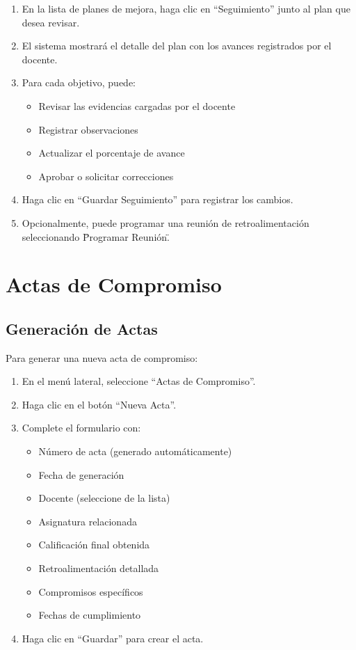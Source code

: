 \documentclass[12pt,a4paper]{book}
\begin{document}
\begin{enumerate}
    \item En la lista de planes de mejora, haga clic en ``Seguimiento'' junto al plan que desea revisar.
    \item El sistema mostrará el detalle del plan con los avances registrados por el docente.
    \item Para cada objetivo, puede:
    \begin{itemize}
        \item Revisar las evidencias cargadas por el docente
        \item Registrar observaciones
        \item Actualizar el porcentaje de avance
        \item Aprobar o solicitar correcciones
\end{itemize}
    \item Haga clic en ``Guardar Seguimiento'' para registrar los cambios.
    \item Opcionalmente, puede programar una reunión de retroalimentación seleccionando \"Programar Reunión\".
\end{enumerate}

\section{Actas de Compromiso}
\subsection{Generación de Actas}
Para generar una nueva acta de compromiso:

\begin{enumerate}
    \item En el menú lateral, seleccione ``Actas de Compromiso''.
    \item Haga clic en el botón ``Nueva Acta''.
    \item Complete el formulario con:
    \begin{itemize}
        \item Número de acta (generado automáticamente)
        \item Fecha de generación
        \item Docente (seleccione de la lista)
        \item Asignatura relacionada
        \item Calificación final obtenida
        \item Retroalimentación detallada
        \item Compromisos específicos
        \item Fechas de cumplimiento
    \end{itemize}
    \item Haga clic en ``Guardar'' para crear el acta.
\end{enumerate}
\end{document}
